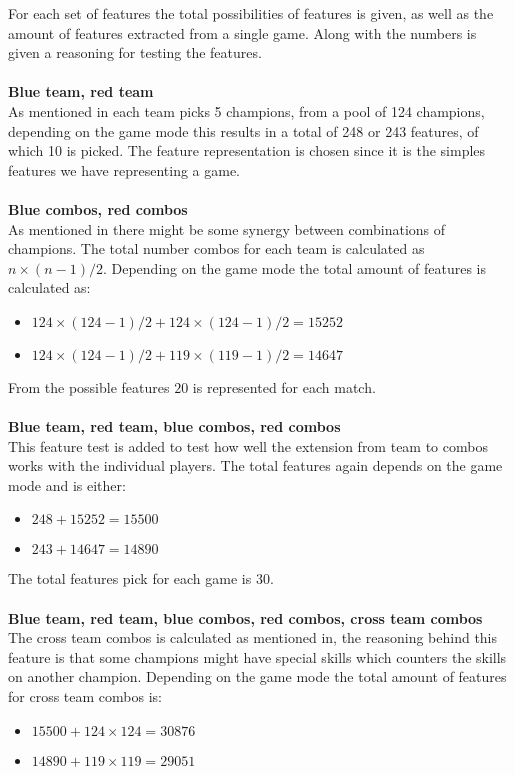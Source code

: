 For each set of features the total possibilities of features is given, as well as the amount of features extracted from a single game. Along with the numbers is given a reasoning for testing the features.  
\\\\
\textbf{Blue team, red team} \\
As mentioned in each team picks 5 champions, from a pool of 124 champions, depending on the game mode this results in a total of 248 or 243 features, of which 10 is picked. The feature representation is chosen since it is the simples features we have representing a game. \\\\
\textbf{Blue combos, red combos} \\
As mentioned in there might be some synergy between combinations of champions. The total number combos for each team is calculated as $n \times (n-1)/2$. Depending on the game mode the total amount of features is calculated as:  
\begin{itemize}
\item $124 \times (124-1)/2 + 124 \times (124-1)/2 = 15252$
\item $124 \times (124-1)/2 + 119 \times (119-1)/2 = 14647$
\end{itemize}
From the possible features $20$ is represented for each match. \\\\
\textbf{Blue team, red team, blue combos, red combos} \\
This feature test is added to test how well the extension from team to combos works with the individual players. The total features again depends on the game mode and is either: 
\begin{itemize}
\item $248 + 15252 = 15500$
\item $243 + 14647 = 14890$
\end{itemize}
The total features pick for each game is 30.\\\\
\textbf{Blue team, red team, blue combos, red combos, cross team combos}\\
The cross team combos is calculated as mentioned in, the reasoning behind this feature is that some champions might have special skills which counters the skills on another champion. 
Depending on the game mode the total amount of features for cross team combos is: 
\begin{itemize}
\item $15500+124\times124 = 30876$
\item $14890+119\times119 = 29051$
\end{itemize}
